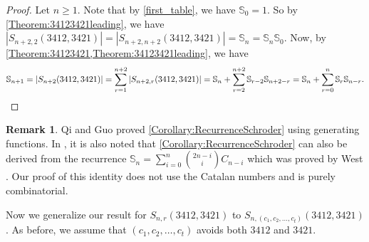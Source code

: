 \documentclass[11pt]{article}
\theoremstyle{definition}
\newtheorem{remark}[theorem]{Remark}
\numberwithin{equation}{section}
\begin{document}
\begin{proof}
    Let $n\geq1$. Note that by \cref{first_table}, we have $\mathbb{S}_0=1$. So by \cref{Theorem:34123421leading}, we have $|S_{n+2,2}(3412,3421)|=|S_{n+2,n+2}(3412,3421)|=\mathbb{S}_n=\mathbb{S}_n\mathbb{S}_0$. Now, by \cref{Theorem:34123421,Theorem:34123421leading}, we have
    \[
    \mathbb{S}_{n+1}=|S_{n+2}(3412,3421)|=\sum_{r=1}^{n+2}|S_{n+2,r}(3412,3421)|=\mathbb{S}_{n}+\sum_{r=2}^{n+2}\mathbb{S}_{r-2}\mathbb{S}_{n+2-r}=\mathbb{S}_n+\sum_{r=0}^{n}\mathbb{S}_{r}\mathbb{S}_{n-r}.\qedhere
    \]
\end{proof}

\begin{remark}
Qi and Guo \cite[Theorem 5]{QiGuo2017} proved \cref{Corollary:RecurrenceSchroder} using generating functions. In \cite[p. 446]{Bona2022}, it is also noted that \cref{Corollary:RecurrenceSchroder} can also be 
derived from the recurrence $\mathbb{S}_n=\sum_{i=0}^n\binom{2n-i}{i}C_{n-i}$ which was proved by West \cite[p. 255]{West1996}. Our proof of this identity does not use the Catalan numbers and is purely combinatorial. 
\end{remark}

Now we generalize our result for $S_{n,r}(3412,3421)$ to $S_{n,(c_1,c_2,\ldots,c_t)}(3412,3421)$. As before, we assume that $(c_1,c_2,\ldots,c_t)$ avoids both $3412$ and $3421$. 
\end{document}
